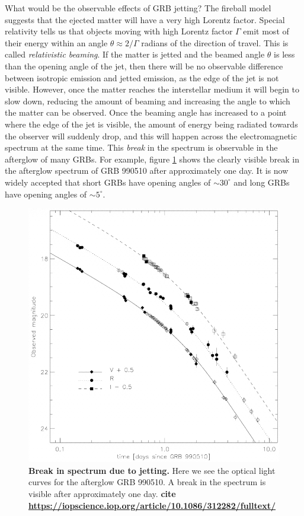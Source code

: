 \documentclass[11pt]{cuthesis}
\begin{document}
What would be the observable effects of GRB jetting? The fireball model suggests that the ejected matter will have a very high Lorentz factor. Special relativity tells us that objects moving with high Lorentz factor $\Gamma$ emit most of their energy within an angle $\theta\approx 2/\Gamma$ radians of the direction of travel. This is called \textit{relativistic beaming}. If the matter is jetted and the beamed angle $\theta$ is less than the opening angle of the jet, then there will be no observable difference between isotropic emission and jetted emission, as the edge of the jet is not visible. However, once the matter reaches the interstellar medium it will begin to slow down, reducing the amount of beaming and increasing the angle to which the matter can be observed. Once the beaming angle has increased to a point where the edge of the jet is visible, the amount of energy being radiated towards the observer will suddenly drop, and this will happen across the electromagnetic spectrum at the same time. This \textit{break} in the spectrum is observable in the afterglow of many GRBs. For example, figure \ref{fig:jetbreak} shows the clearly visible break in the afterglow spectrum of GRB 990510 after approximately one day. It is now widely accepted that short GRBs have opening angles of $\sim 30^\circ$ and long GRBs have opening angles of $\sim 5^\circ$.

\begin{figure} %
\begin{center}
\includegraphics[width=0.8\linewidth]{jetbreak.png}
\end{center}
\caption{\textbf{Break in spectrum due to jetting.} Here we see the optical light curves for the afterglow GRB 990510. A break in the spectrum is visible after approximately one day. \textbf{cite \url{https://iopscience.iop.org/article/10.1086/312282/fulltext/} }}
\label{fig:jetbreak}
\end{figure}
\end{document}
